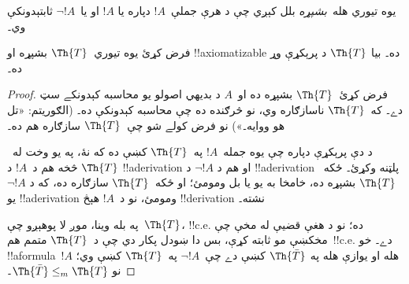 \documentclass[../../../include/open-logic-section]{subfiles}
\begin{document}


يوه تيوري هله~\emph{بشپړه} بلل کېږي چې د هرې جملې~$!A$ دپاره يا
$!A$ او يا~$\lnot !A$ ثابتېدونکې وي۔

\begin{lem}
فرض کړئ يوه تيوري~$\Th{T}$ بشپړه او !!{axiomatizable} ده۔ بيا
$\Th{T}$ د پرېکړې وړ ده۔
\end{lem}

\begin{proof}
فرض کړئ~$\Th{T}$ بشپړه ده او~$A$ د بديهي اصولو يو محاسبه کېدونکے
سټ دے۔ که~$\Th{T}$ ناسازګاره وي، نو څرګنده ده چې محاسبه کېدونکې
ده۔ (الګوريتم: «تل هو ووايه۔») نو فرض کولے شو چې~$\Th{T}$ سازګاره
هم ده۔

د دې پرېکړې دپاره چې يوه جمله~$!A$ په~$\Th{T}$ کښې ده که نۀ،
په يو وخت له~$\Th{T}$ څخه هم د~$!A$ د !!a{derivation} او هم د
$\lnot !A$ د !!a{derivation} پلټنه وکړئ۔ ځکه~$\Th{T}$ بشپړه ده،
خامخا به يو يا بل ومومئ؛ او ځکه~$\Th{T}$ سازګاره ده، که د
$\lnot !A$ يو !!a{derivation} ومومئ، نو د~$!A$ هېڅ !!{derivation}
نشته۔

په بله وينا، موږ لا پوهېږو چې~$\Th{T}$، !!{c.e.} ده؛ نو د هغې
قضيې له مخې چې مخکښې مو ثابته کړې، بس دا ښودل پکار دي چې د~$\Th{T}$
متمم هم~!!{c.e.} دے۔ خو !!a{formula}~$!A$ هله او يوازې هله په
$\Th{\bar T}$ کښې دے چې~$\lnot !A$ په~$\Th{T}$ کښې وي؛ نو
$\Th{\bar T} \leq_m \Th{T}$۔
\end{proof}
\end{document}
